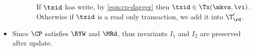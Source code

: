 \begin{itemize}
\begin{itemize}
\begin{itemize}
        If \( \txid \) has write, by \cref{equ:cp-dagger} then \( \txid \in \Tx(\mkvs,\vi) \).
        Otherwise if \( \txid \) is a read only transaction, we add it into \( \T'_\rd \).
    \end{itemize}
\end{itemize}

\item Since \( \CP \) satisfies \( \RYW \) and \( \MRd \), thus invariants \( I_1 \) and  \( I_2 \) are preserved after update.

\end{itemize}


